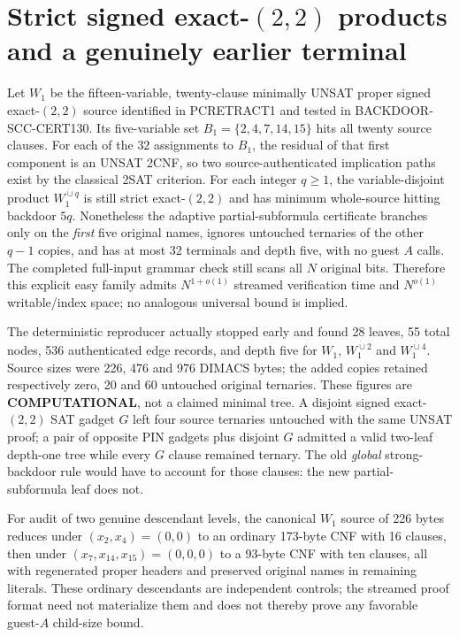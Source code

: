 \documentclass[11pt]{article}
\begin{document}
\section{Strict signed exact-$(2,2)$ products and a genuinely earlier terminal}
Let $W_1$ be the fifteen-variable, twenty-clause minimally UNSAT proper signed exact-$(2,2)$ source identified in PCRETRACT1 and tested in BACKDOOR-SCC-CERT130. Its five-variable set $B_1=\{2,4,7,14,15\}$ hits all twenty source clauses. For each of the $32$ assignments to $B_1$, the residual of that first component is an UNSAT 2CNF, so two source-authenticated implication paths exist by the classical 2SAT criterion. For each integer $q\ge1$, the variable-disjoint product $W_1^{\dot\cup q}$ is still strict exact-$(2,2)$ and has minimum whole-source hitting backdoor $5q$. Nonetheless the adaptive partial-subformula certificate branches only on the \emph{first} five original names, ignores untouched ternaries of the other $q-1$ copies, and has at most 32 terminals and depth five, with no guest $A$ calls. The completed full-input grammar check still scans all $N$ original bits. Therefore this explicit easy family admits $N^{1+o(1)}$ streamed verification time and $N^{o(1)}$ writable/index space; no analogous universal bound is implied.

The deterministic reproducer actually stopped early and found 28 leaves, 55 total nodes, 536 authenticated edge records, and depth five for $W_1$, $W_1^{\dot\cup2}$ and $W_1^{\dot\cup4}$. Source sizes were 226, 476 and 976 DIMACS bytes; the added copies retained respectively zero, 20 and 60 untouched original ternaries. These figures are \textbf{COMPUTATIONAL}, not a claimed minimal tree. A disjoint signed exact-$(2,2)$ SAT gadget $G$ left four source ternaries untouched with the same UNSAT proof; a pair of opposite PIN gadgets plus disjoint $G$ admitted a valid two-leaf depth-one tree while every $G$ clause remained ternary. The old \emph{global} strong-backdoor rule would have to account for those clauses: the new partial-subformula leaf does not.

For audit of two genuine descendant levels, the canonical $W_1$ source of 226 bytes reduces under $(x_2,x_4)=(0,0)$ to an ordinary 173-byte CNF with 16 clauses, then under $(x_7,x_{14},x_{15})=(0,0,0)$ to a 93-byte CNF with ten clauses, all with regenerated proper headers and preserved original names in remaining literals. These ordinary descendants are independent controls; the streamed proof format need not materialize them and does not thereby prove any favorable guest-$A$ child-size bound.
\end{document}
